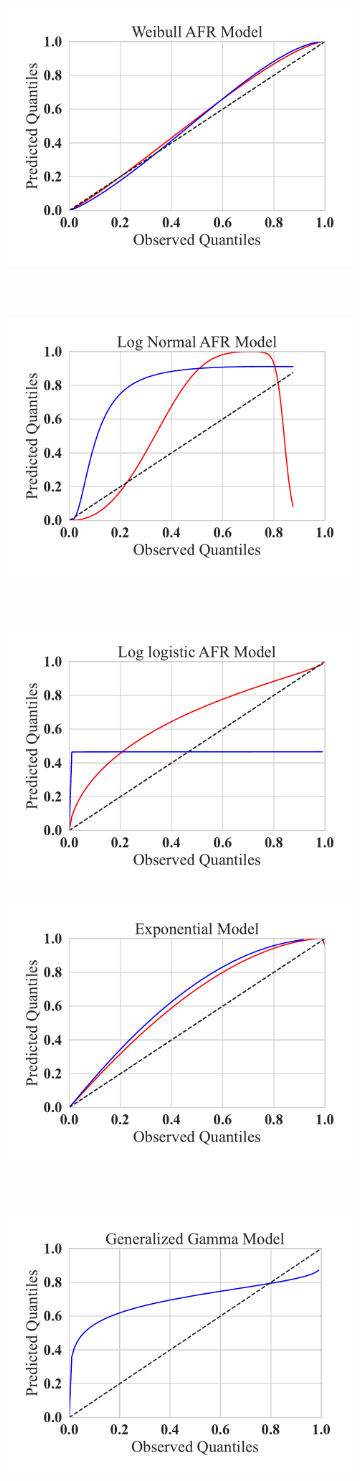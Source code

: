 \begin{figure}
	\begin{subfigure}
		\centering
		\includegraphics[width=.32\textwidth]{plots/weibull_qq.pdf}
	\end{subfigure}%
	~
	\begin{subfigure}
		\centering
		\includegraphics[width=.32\textwidth]{plots/log_normal_qq.pdf}
	\end{subfigure}
	~
	\begin{subfigure}
		\centering
		\includegraphics[width=.32\textwidth]{plots/log_logistic_qq.pdf}
	\end{subfigure}
 \begin{subfigure}
		\centering
		\includegraphics[width=.32\textwidth]{plots/exponential_qq.pdf}
	\end{subfigure}%
	~
	\begin{subfigure}
		\centering
		\includegraphics[width=.32\textwidth]{plots/gamma_qq.pdf}

\end{subfigure}
\end{figure}
